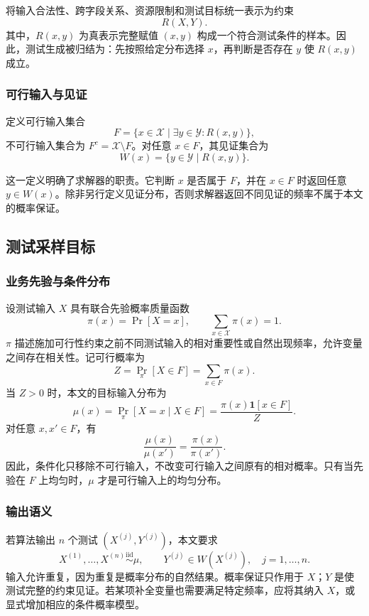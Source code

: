 \documentclass[UTF8, fontset=none, a4paper, 12pt]{ctexart}
\newcommand{\InputSpace}{\mathcal{X}}
\newcommand{\WitnessSpace}{\mathcal{Y}}
\begin{document}
将输入合法性、跨字段关系、资源限制和测试目标统一表示为约束
\[
  R(X,Y).
\]
其中，$R(x,y)$ 为真表示完整赋值 $(x,y)$ 构成一个符合测试条件的样本。因此，测试生成被归结为：先按照给定分布选择 $x$，再判断是否存在 $y$ 使 $R(x,y)$ 成立。

\subsubsection{可行输入与见证}

定义可行输入集合
\[
  F=\{x\in\InputSpace\mid
  \exists y\in\WitnessSpace:R(x,y)\},
\]
不可行输入集合为 $F^{c}=\InputSpace\setminus F$。对任意 $x\in F$，其见证集合为
\[
  W(x)=\{y\in\WitnessSpace\mid R(x,y)\}.
\]

这一定义明确了求解器的职责。它判断 $x$ 是否属于 $F$，并在 $x\in F$ 时返回任意 $y\in W(x)$。除非另行定义见证分布，否则求解器返回不同见证的频率不属于本文的概率保证。

\subsection{测试采样目标}

\subsubsection{业务先验与条件分布}

设测试输入 $X$ 具有联合先验概率质量函数
\[
  \pi(x)=\Pr[X=x],
  \qquad
  \sum_{x\in\InputSpace}\pi(x)=1.
\]
$\pi$ 描述施加可行性约束之前不同测试输入的相对重要性或自然出现频率，允许变量之间存在相关性。记可行概率为
\[
  Z=\Pr_{\pi}[X\in F]
   =\sum_{x\in F}\pi(x).
\]
当 $Z>0$ 时，本文的目标输入分布为
\[
  \mu(x)
  =\Pr_{\pi}[X=x\mid X\in F]
  =\frac{\pi(x)\mathbf{1}[x\in F]}{Z}.
\]
对任意 $x,x'\in F$，有
\[
  \frac{\mu(x)}{\mu(x')}
  =\frac{\pi(x)}{\pi(x')}.
\]
因此，条件化只移除不可行输入，不改变可行输入之间原有的相对概率。只有当先验在 $F$ 上均匀时，$\mu$ 才是可行输入上的均匀分布。

\subsubsection{输出语义}

若算法输出 $n$ 个测试 $(X^{(j)},Y^{(j)})$，本文要求
\[
  X^{(1)},\ldots,X^{(n)}
  \overset{\mathrm{iid}}{\sim}\mu,
  \qquad
  Y^{(j)}\in W(X^{(j)}),
  \quad j=1,\ldots,n.
\]
输入允许重复，因为重复是概率分布的自然结果。概率保证只作用于 $X$；$Y$ 是使测试完整的约束见证。若某项补全变量也需要满足特定频率，应将其纳入 $X$，或显式增加相应的条件概率模型。
\end{document}
